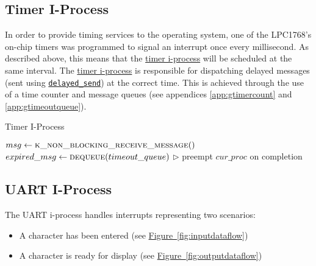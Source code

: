 \documentclass[12pt]{report}
\begin{document}
\subsection{Timer I-Process}
\label{subsec:Timer I-Process}

In order to provide timing services to the operating system, one of the LPC1768's on-chip timers was programmed to signal an interrupt once every millisecond. As described above, this means that the \hyperref[alg:timeriprocess]{timer i-process} will be scheduled at the same interval. The \hyperref[alg:timeriprocess]{timer i-process} is responsible for dispatching delayed messages (sent using \hyperref[alg:sendingdelayedmessages]{\texttt{delayed_send}}) at the correct time. This is achieved through the use of a time counter and message queues (see appendices \ref{app:gtimercount} and \ref{app:gtimeoutqueue}).\\

\begin{algorithm}
\caption{Timer I-Process}
\label{alg:timeriprocess}
\begin{algorithmic}[1]
    \State $msg \leftarrow \Call{k\_non\_blocking\_receive\_message}{\null}$
    \State {}
        \State $expired\_msg \leftarrow \Call{dequeue}{timeout\_queue}$
        \State {} 
            \State $\triangleright$ preempt $cur\_proc$ on completion
        \EndIf
    \EndWhile
\EndProcedure
\end{algorithmic}
\end{algorithm}

\subsection{UART I-Process}
\label{subsec:UART I-Process}

The UART i-process handles interrupts representing two scenarios:

\begin{itemize}

\item A character has been entered (see \hyperref[fig:inputdataflow]{Figure~\ref*{fig:inputdataflow}})
\item A character is ready for display (see \hyperref[fig:outputdataflow]{Figure~\ref*{fig:outputdataflow}})

\end{itemize}
\end{document}
